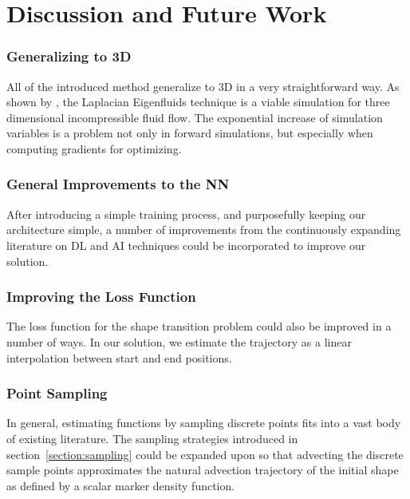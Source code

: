 \chapter{Discussion and Future Work}\label{chapter:discussion}


\subsection*{Generalizing to 3D}
All of the introduced method generalize to 3D in a very straightforward way. As
shown by \cite{scalable-eigenfluids}, the Laplacian Eigenfluids technique is
a viable simulation for three dimensional incompressible fluid flow. The
exponential increase of simulation variables is a problem not only in forward
simulations, but especially when computing gradients for optimizing. 

\subsection*{General Improvements to the NN}
After introducing a simple training process, and purposefully keeping our
architecture simple, a number of improvements from the continuously expanding
literature on \ac{DL} and \ac{AI} techniques could be incorporated to improve
our solution.

\subsection*{Improving the Loss Function}
The loss function for the shape transition problem could also be improved in
a number of ways. In our solution, we estimate the trajectory as a linear
interpolation between start and end positions. \

\subsection*{Point Sampling}
In general, estimating functions by sampling discrete points fits into a vast
body of existing literature. The sampling strategies introduced in
section~\ref{section:sampling} could be expanded upon so that advecting the
discrete sample points approximates the natural advection trajectory of the
initial shape as defined by a scalar marker density function.


